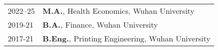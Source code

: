 

\renewcommand{\thefootnote}{\fnsymbol{footnote}}
\setcounter{footnote}{0}

\begin{longtable}[l]{@{}p{} p{}}
    2022--25 & \textbf{M.A.}, Health Economics, Wuhan University \\
    2019-21 & \textbf{B.A.}, Finance, Wuhan University \\

    2017-21 & \textbf{B.Eng.}, Printing Engineering, Wuhan University \\

\end{longtable}



\renewcommand{\thefootnote}{\arabic{footnote}}
\setcounter{footnote}{1}

